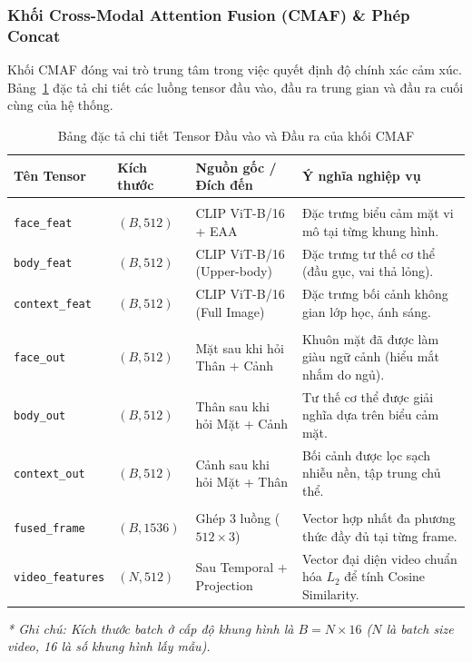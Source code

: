 \documentclass[10pt,a4paper]{article}
\begin{document}
\subsubsection{Khối Cross-Modal Attention Fusion (CMAF) \& Phép Concat}
Khối CMAF đóng vai trò trung tâm trong việc quyết định độ chính xác cảm xúc. Bảng~\ref{tab:cmaf_io} đặc tả chi tiết các luồng tensor đầu vào, đầu ra trung gian và đầu ra cuối cùng của hệ thống.

\begin{table}[H]
\centering
\small
\caption{Bảng đặc tả chi tiết Tensor Đầu vào và Đầu ra của khối CMAF}
\label{tab:cmaf_io}
\begin{tabularx}{\textwidth}{p{2.6cm} p{2.2cm} p{3.2cm} X}
\toprule
\rowcolor{tableheader}
\textbf{Tên Tensor} & \textbf{Kích thước} & \textbf{Nguồn gốc / Đích đến} & \textbf{Ý nghĩa nghiệp vụ} \\
\midrule
\rowcolor{grouprow} \multicolumn{4}{l}{\textbf{I. Đầu vào (Inputs của khối CMAF)}} \\
\texttt{face\_feat} & $(B, 512)$ & CLIP ViT-B/16 + EAA & Đặc trưng biểu cảm mặt vi mô tại từng khung hình. \\
\texttt{body\_feat} & $(B, 512)$ & CLIP ViT-B/16 (Upper-body) & Đặc trưng tư thế cơ thể (đầu gục, vai thả lỏng). \\
\texttt{context\_feat} & $(B, 512)$ & CLIP ViT-B/16 (Full Image) & Đặc trưng bối cảnh không gian lớp học, ánh sáng. \\
\midrule
\rowcolor{grouprow} \multicolumn{4}{l}{\textbf{II. Đầu ra trung gian (Sau Cross-Attention)}} \\
\texttt{face\_out} & $(B, 512)$ & Mặt sau khi hỏi Thân + Cảnh & Khuôn mặt đã được làm giàu ngữ cảnh (hiểu mắt nhắm do ngủ). \\
\texttt{body\_out} & $(B, 512)$ & Thân sau khi hỏi Mặt + Cảnh & Tư thế cơ thể được giải nghĩa dựa trên biểu cảm mặt. \\
\texttt{context\_out} & $(B, 512)$ & Cảnh sau khi hỏi Mặt + Thân & Bối cảnh được lọc sạch nhiễu nền, tập trung chủ thể. \\
\midrule
\rowcolor{grouprow} \multicolumn{4}{l}{\textbf{III. Đầu ra cuối cùng (Sau Concatenation \& Pipeline)}} \\
\texttt{fused\_frame} & $(B, 1536)$ & Ghép 3 luồng ($512 \times 3$) & Vector hợp nhất đa phương thức đầy đủ tại từng frame. \\
\texttt{video\_features} & $(N, 512)$ & Sau Temporal + Projection & Vector đại diện video chuẩn hóa $L_2$ để tính Cosine Similarity. \\
\bottomrule
\end{tabularx}
\vspace{1mm}
\raggedright\footnotesize\textit{* Ghi chú: Kích thước batch ở cấp độ khung hình là $B = N \times 16$ ($N$ là batch size video, 16 là số khung hình lấy mẫu).}
\end{table}
\end{document}
